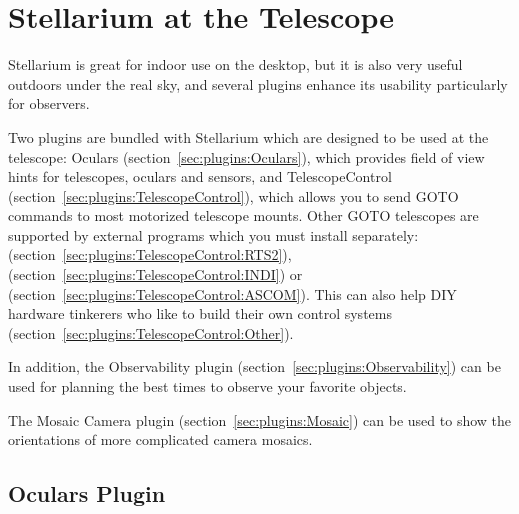 \chapter{Stellarium at the Telescope}
\label{ch:atTheTelescope}

Stellarium is great for indoor use on the desktop, but it is also very
useful outdoors under the real sky, and several plugins enhance its
usability particularly for observers.

Two plugins are bundled with Stellarium which are designed to be used
at the telescope: Oculars (section~\ref{sec:plugins:Oculars}), which
provides field of view hints for telescopes, oculars and sensors, and
TelescopeControl (section~\ref{sec:plugins:TelescopeControl}), which
allows you to send GOTO commands to most motorized telescope mounts. Other
GOTO telescopes are supported by external programs which you must
install separately:  (section~\ref{sec:plugins:TelescopeControl:RTS2}), 
 (section~\ref{sec:plugins:TelescopeControl:INDI}) or  (section~\ref{sec:plugins:TelescopeControl:ASCOM}). 
This can also help DIY hardware tinkerers who like to build their own control systems (section~\ref{sec:plugins:TelescopeControl:Other}).

In addition, the Observability plugin (section~\ref{sec:plugins:Observability})
can be used for planning the best times to observe your favorite
objects.

The Mosaic Camera plugin (section~\ref{sec:plugins:Mosaic}) can be used to
show the orientations of more complicated camera mosaics.

\section{Oculars Plugin}
\label{sec:plugins:Oculars}

